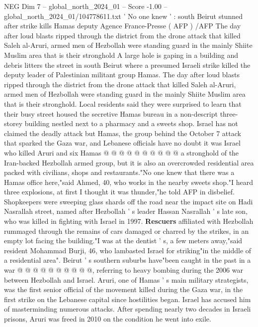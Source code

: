 \begin{textsample}{NEG Dim 7 – global\_north\_2024\_01 – Score -1.00 – global\_north\_2024\_01/104778611.txt}  \label{ex:f7_neg_264}
' No one knew ' : south Beirut stunned after strike kills Hamas deputy Agence France-Presse ( AFP ) /AFP The day after loud blasts ripped through the district from the drone attack that killed Saleh al-Aruri, armed men of Hezbollah were standing guard in the mainly Shiite Muslim area that is their stronghold A large hole is gaping in a building and debris litters the street in south Beirut where a presumed Israeli strike killed the deputy leader of Palestinian militant group Hamas.
The day after loud blasts ripped through the district from the drone attack that killed Saleh al-Aruri, armed men of Hezbollah were standing guard in the mainly Shiite Muslim area that is their stronghold.
Local residents said they were surprised to learn that their busy street housed the secretive Hamas bureau in a non-descript three-storey building nestled next to a pharmacy and a sweets shop.
Israel has not claimed the deadly attack but Hamas, the group behind the October 7 attack that sparked the Gaza war, and Lebanese officials have no doubt it was Israel who killed Aruri and six Hamas @ @ @ @ @ @ @ @ @ @ a stronghold of the Iran-backed Hezbollah armed group, but it is also an overcrowded residential area packed with civilians, shops and restaurants."No one knew that there was a Hamas office here,"said Ahmed, 40, who works in the nearby sweets shop."I heard three explosions, at first I thought it was thunder,"he told AFP in disbelief.
Shopkeepers were sweeping glass shards off the road near the impact site on Hadi Nasrallah street, named after Hezbollah ' s leader Hassan Nasrallah ' s late son, who was killed in fighting with Israel in 1997. \textbf{Rescuers} affiliated with Hezbollah rummaged through the remains of cars damaged or charred by the strikes, in an empty lot facing the building."I was at the dentist ' s, a few meters away,"said resident Mohammad Burji, 46, who lambasted Israel for striking"in the middle of a residential area".
Beirut ' s southern suburbs have"been caught in the past in a war @ @ @ @ @ @ @ @ @ @, referring to heavy bombing during the 2006 war between Hezbollah and Israel.
Aruri, one of Hamas ' s main military strategists, was the first senior official of the movement killed during the Gaza war, in the first strike on the Lebanese capital since hostilities began.
Israel has accused him of masterminding numerous attacks.
After spending nearly two decades in Israeli prisons, Aruri was freed in 2010 on the condition he went into exile.

\end{textsample}
